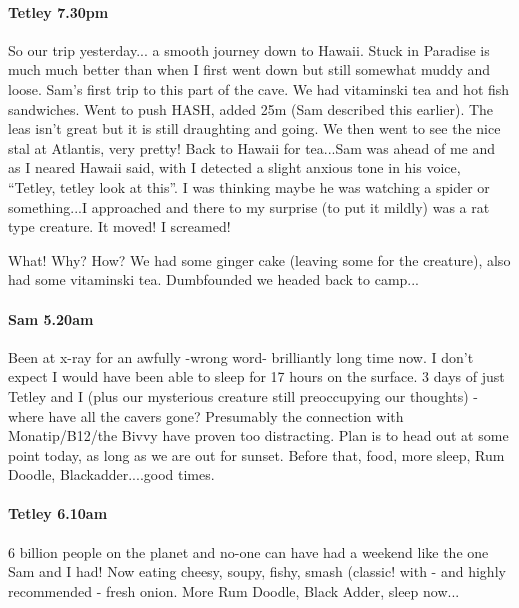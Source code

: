 \paragraph{Tetley 7.30pm}

So our trip yesterday... a smooth journey down to Hawaii. Stuck in Paradise is much much better than when I first went down but still somewhat muddy and loose. Sam’s first trip to this part of the cave. We had vitaminski tea and hot fish sandwiches. Went to push HASH, added 25m (Sam described this earlier). The leas isn’t great but it is still draughting and going. We then went to see the nice stal at Atlantis, very pretty! Back to Hawaii for tea...Sam was ahead of me and as I neared Hawaii said, with I detected a slight anxious tone in his voice, “Tetley, tetley look at this”. I was thinking maybe he was watching a spider or something...I approached and there to my surprise (to put it mildly) was a rat type creature. It moved! I screamed!

What! Why? How? We had some ginger cake (leaving some for the creature), also had some vitaminski tea. Dumbfounded we headed back to camp...

\paragraph{Sam 5.20am}
Been at x-ray for an awfully -wrong word- brilliantly long time now. I don't expect I would have been able to sleep for 17 hours on the surface. 3 days of just Tetley and I (plus our mysterious creature still preoccupying our thoughts) - where have all the cavers gone? Presumably the connection with Monatip/B12/the Bivvy have proven too distracting. Plan is to head out at some point today, as long as we are out for sunset. Before that, food, more sleep, Rum Doodle, Blackadder....good times.

\paragraph{Tetley 6.10am}
6 billion people on the planet and no-one can have had a weekend like the one Sam and I had! Now eating cheesy, soupy, fishy, smash (classic! with - and highly recommended - fresh onion. More Rum Doodle, Black Adder, sleep now...

